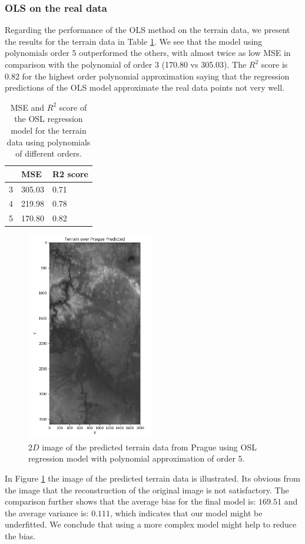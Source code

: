 \documentclass [11pt]{article}
\begin{document}
\subsubsection{OLS on the real data}
Regarding the performance of the OLS method on the terrain data, we present the results for the terrain data in Table \ref{tab:olsTerrain}. We see that the model using polynomials order $5$ outperformed the others, with almost twice as low MSE in comparison with the polynomial of order $3$ (170.80 vs 305.03). The $R^{2}$ score is $0.82$ for the highest order polynomial approximation saying that the regression predictions of the OLS model approximate the real data points not very well. 
\begin{table}[H]
\centering
\begin{tabular}{lll}
\hline
  & MSE    & R2 score \\ \hline
3 & 305.03 & 0.71      \\
4 & 219.98 & 0.78     \\
5 & 170.80 & 0.82     \\ \hline
\end{tabular}
\caption{MSE and $R^{2}$ score of the OSL regression model for the terrain data using polynomials of different orders.}
\label{tab:olsTerrain}
\end{table}

\begin{figure}[H]
\centering
\includegraphics[width=0.5\textwidth]{figures/TerrainPraguePred.png}
        \caption{$2D$ image of the predicted terrain data from Prague using OSL regression model with polynomial approximation of order $5$.}
        \label{fig:TerrainPraguePred}
\end{figure}
In Figure \ref{fig:TerrainPraguePred} the image of the predicted terrain data is illustrated. Its obvious from the image that the reconstruction of the original image is not satisfactory. The comparison further shows that the average bias for the final model is: $169.51$ and the average variance is: $0.111$, which indicates that our model might be underfitted. We conclude that using a more complex model might help to reduce the bias.
\end{document}
